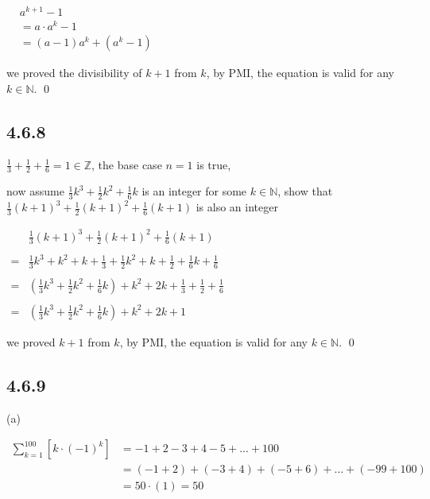 \documentclass{article}
\begin{document}
\begin{center}
    $\begin{aligned}&a^{k+1}-1\\&=a\cdot a^{k}-1\\&=\left(a-1\right)a^{k}+\left(a^{k}-1\right)\end{aligned}$
\end{center}

we proved the divisibility of $k+1$ from $k$, by PMI, the equation is valid for any $k\in \mathbb{N}$. \qed

\subsection*{4.6.8}

$\frac{1}{3}+\frac{1}{2}+\frac{1}{6}=1\in \mathbb{Z}$, the base case $n=1$ is true,

now assume $\frac{1}{3}k^3+\frac{1}{2}k^2+\frac{1}{6}k$ is an integer for some $k\in \mathbb{N}$, show that $\frac{1}{3}(k+1)^3+\frac{1}{2}(k+1)^2+\frac{1}{6}(k+1)$ is also an integer

\begin{center}
    $\begin{aligned}&\frac13\left(k+1\right)^3+\frac12\left(k+1\right)^2+\frac16\left(k+1\right)\\\\=&\frac13k^3+k^2+k+\frac13+\frac12k^2+k+\frac12+\frac16k+\frac16\\\\=&\left(\frac13k^3+\frac12k^2+\frac16k\right)+k^2+2k+\frac13+\frac12+\frac16\\\\=&\left(\frac13k^3+\frac12k^2+\frac16k\right)+k^2+2k+1\end{aligned}$
\end{center}

we proved $k+1$ from $k$, by PMI, the equation is valid for any $k\in \mathbb{N}$. \qed

\subsection*{4.6.9}

(a)

\begin{align*}
    \sum_{k=1}^{100}\left[k\cdot(-1)^k\right] &= - 1 + 2 - 3 + 4 - 5 + ... + 100\\
    &= (- 1 + 2) + (- 3 + 4) + (- 5 + 6) + ... + (- 99 + 100)\\
    &= 50 \cdot (1) = 50
\end{align*}
\end{document}
